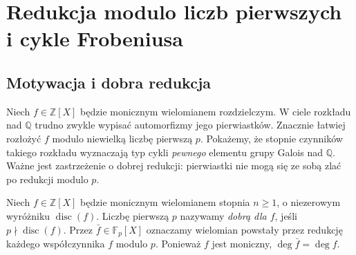 \chapter[Redukcja modulo p i cykle Frobeniusa]{Redukcja modulo liczb pierwszych i cykle Frobeniusa}\label{aa:ch:frobenius-reduction}

\section{Motywacja i dobra redukcja}
Niech $f\in\mathbb Z[X]$ będzie monicznym wielomianem rozdzielczym.
W ciele rozkładu nad $\mathbb Q$ trudno zwykle wypisać automorfizmy
jego pierwiastków. Znacznie łatwiej rozłożyć $f$ modulo niewielką
liczbę pierwszą $p$. Pokażemy, że stopnie czynników takiego rozkładu
wyznaczają typ cykli \emph{pewnego} elementu grupy Galois nad
$\mathbb Q$. Ważne jest zastrzeżenie o dobrej redukcji:
pierwiastki nie mogą się ze sobą zlać po redukcji modulo $p$.

\begin{definicja}\label{aa:def:good-reduction}
Niech $f\in\mathbb Z[X]$ będzie monicznym wielomianem stopnia
$n\ge1$, o niezerowym wyróżniku $\operatorname{disc}(f)$.
Liczbę pierwszą $p$ nazywamy \emph{dobrą dla $f$}, jeśli
$p\nmid\operatorname{disc}(f)$.
Przez $\bar f\in\mathbb F_p[X]$ oznaczamy wielomian powstały
przez redukcję każdego współczynnika $f$ modulo $p$.
Ponieważ $f$ jest moniczny, $\deg\bar f=\deg f$.
\end{definicja}

